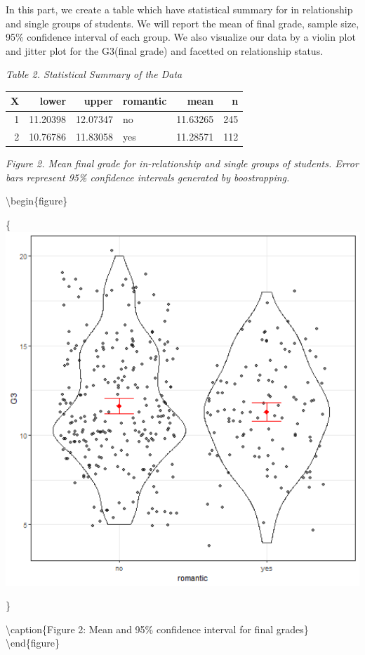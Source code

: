 \documentclass[]{article}
\begin{document}
In this part, we create a table which have statistical summary for in
relationship and single groups of students. We will report the mean of
final grade, sample size, 95\% confidence interval of each group. We
also visualize our data by a violin plot and jitter plot for the
G3(final grade) and facetted on relationship status.

\emph{Table 2. Statistical Summary of the Data}

\begin{longtable}[]{@{}rrrlrr@{}}
\toprule
X & lower & upper & romantic & mean & n\tabularnewline
\midrule
\endhead
1 & 11.20398 & 12.07347 & no & 11.63265 & 245\tabularnewline
2 & 10.76786 & 11.83058 & yes & 11.28571 & 112\tabularnewline
\bottomrule
\end{longtable}

\emph{Figure 2. Mean final grade for in-relationship and single groups
of students. Error bars represent 95\% confidence intervals generated by
boostrapping.}

\textbackslash{}begin\{figure\}

\{\centering \includegraphics[width=6.67in]{../results/CI_plot}

\}

\textbackslash{}caption\{Figure 2: Mean and 95\% confidence interval for
final grades\}\label{fig:unnamed-chunk-5} \textbackslash{}end\{figure\}
\end{document}
